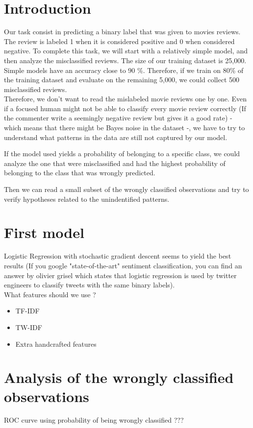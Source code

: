 \documentclass{report}
\begin{document}
\maketitle

\section{Introduction}
Our task consist in predicting a binary label that was given to movies reviews. The review is labeled 1 when it is considered positive and 0 when considered negative. To complete this task, we will start with a relatively simple model, and then analyze the misclassified reviews. The size of our training dataset is 25,000. Simple models have an accuracy close to 90 \%. Therefore, if we train on 80\% of the training dataset and evaluate on the remaining 5,000, we could collect 500 misclassified reviews.
\\
Therefore, we don't want to read the mislabeled movie reviews one by one. Even if a focused human might not be able to classify every movie review correctly (If the commenter write a seemingly negative review but gives it a good rate) - which means that there might be Bayes noise in the dataset -, we have to try to understand what patterns in the data are still not captured by our model. 

If the model used yields a probability of belonging to a specific class, we could analyze the one that were misclassified and had the highest probability of belonging to the class that was wrongly predicted.

Then we can read a small subset of the wrongly classified observations and try to verify hypotheses related to the unindentified patterns.


\section{First model}

Logistic Regression with stochastic gradient descent seems to yield the best results (If you google "state-of-the-art" sentiment classification, you can find an answer by olivier grisel which states that logistic regression is used by twitter engineers to classify tweets with the same binary labels).\\

What features should we use ?

\begin{itemize}
	\item TF-IDF
	\item TW-IDF
	\item Extra handcrafted features
\end{itemize} 

\section{Analysis of the wrongly classified observations}

ROC curve using probability of being wrongly classified ???
\end{document}
